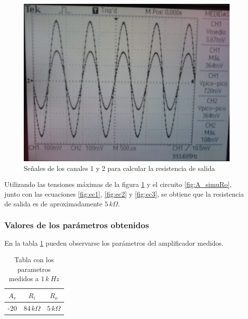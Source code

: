 \documentclass[10pt,spanish,a4paper,notitlepage]{article}
\begin{document}
\begin{figure}[H]
\centering
\includegraphics[scale=0.2]{mediciones/1_Ro.jpg}
\caption{Señales de los canales 1 y 2 para calcular la resistencia de salida}
\label{fig:1_Ro}
\end{figure}

Utilizando las tensiones máximas de la figura \ref{fig:1_Ro} y el circuito \ref{fig:A_simuRo}, junto con las ecuaciones \ref{fig:ec1}, \ref{fig:ec2} y \ref{fig:ec3}, se obtiene que la resistencia de salida es de aproximadamente $5\,\unit{k\Omega}$. 

\subsubsection{Valores de los parámetros obtenidos}
En la tabla  \ref{table:param_med} pueden observarse los parámetros del amplificador medidos.

\begin{table}[H]
    \centering
    \begin{tabular}{|c|c|c|} %
    \hline
    $A_v$ & $R_i$  & $R_o$ \\ \hline
     -20 & $84\,\unit{k\Omega}$  & $5\,\unit{k\Omega}$   \\ \hline
    \end{tabular}
    \caption{Tabla con los parametros medidos a $1\,\unit{k\ Hz}$}
    \label{table:param_med}
    \end{table}
\end{document}
